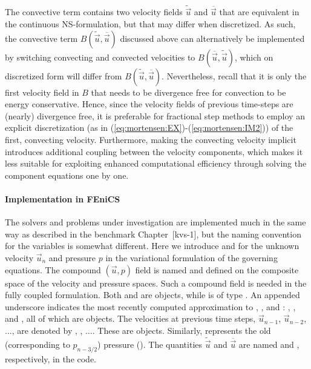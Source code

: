 The convective term contains two velocity fields $\tilde{\vec{u}}$ and
$\overline{\vec{u}}$ that are equivalent in the continuous NS-formulation, but that may differ when
discretized. As such, the convective term
$B(\tilde{\vec{u}},\overline{\vec{u}})$ discussed above can
alternatively be implemented by switching convecting and convected
velocities to $B(\overline{\vec{u}},\tilde{\vec{u}})$, which on
discretized form will differ from
$B(\tilde{\vec{u}},\overline{\vec{u}})$. Nevertheless, recall that it
is only the first velocity field in $B$ that needs to be divergence
free for convection to be energy conservative. Hence, since the
velocity fields of previous time-steps are (nearly) divergence free,
it is preferable for fractional step
methods to employ an explicit discretization (as in
(\eqref{eq:mortensen:EX})-(\eqref{eq:mortensen:IM2})) of the first, convecting
velocity. Furthermore, making the convecting velocity implicit
introduces additional coupling between the velocity components, which
makes it less suitable for exploiting enhanced computational efficiency
through solving the component equations one by one.

\paragraph{Implementation in FEniCS}
\label{sec:mortensen:impl_fenics}
The solvers and problems under investigation are implemented much in the
same way as described in the benchmark Chapter~[kvs-1], but the naming
convention for the variables is somewhat different. Here we introduce
 and  for the unknown velocity $\vec{u}_n$ and pressure $p$
in the
variational formulation of the governing equations. 
The compound
$(\vec{u},p)$ field is named  and
defined on the composite space of the velocity and
pressure spaces. Such a compound field is needed in the 
fully coupled formulation.
Both  and  are
 objects, while  is of type .
An appended underscore indicates
the most recently computed
approximation to , , and :
, , and , all of which are  objects.
The velocities at previous time steps, $\vec{u}_{n-1}$, $\vec{u}_{n-2}$, $\ldots$, are denoted by , , $\ldots$. These are
 objects. Similarly,  represents the old (corresponding to $p_{n-3/2}$)  pressure 
().
The quantities $\tilde{\vec{u}}$ and $\overline{\vec{u}}$ are
named  and , respectively, in the code.

